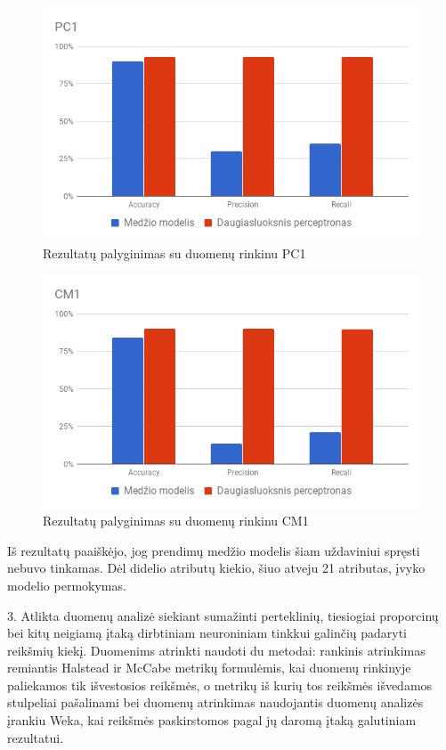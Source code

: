 \documentclass{VUMIFPSbakalaurinis}
\begin{document}
\begin{figure}[H]
    \centering
    \includegraphics[scale=0.5]{img/chart}
    \caption{Rezultatų palyginimas su duomenų rinkinu PC1}
    \label{img:chart}
\end{figure}

\begin{figure}[H]
    \centering
    \includegraphics[scale=0.5]{img/chart-2}
    \caption{Rezultatų palyginimas su duomenų rinkinu CM1}
    \label{img:chart2}
\end{figure}

Iš rezultatų paaiškėjo, jog prendimų medžio modelis šiam uždaviniui spręsti nebuvo tinkamas. Dėl didelio atributų kiekio, šiuo atveju 21 atributas, įvyko modelio permokymas.

3. Atlikta duomenų analizė siekiant sumažinti perteklinių, tiesiogiai proporcinų bei kitų neigiamą įtaką dirbtiniam neuroniniam tinkkui galinčių padaryti reikšmių kiekį. Duomenims atrinkti naudoti du metodai: rankinis atrinkimas remiantis Halstead ir McCabe metrikų formulėmis, kai duomenų rinkinyje paliekamos tik išvestosios reikšmės, o metrikų iš kurių tos reikšmės išvedamos stulpeliai pašalinami bei duomenų atrinkimas naudojantis duomenų analizės įrankiu Weka, kai reikšmės paskirstomos pagal jų daromą įtaką galutiniam rezultatui.
\end{document}
